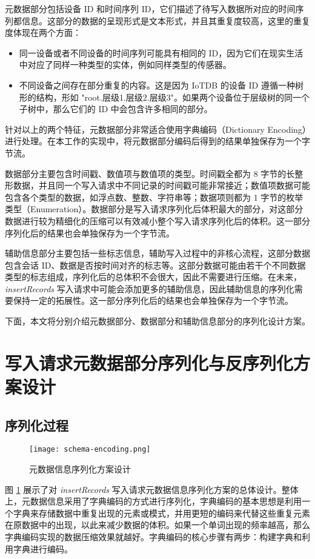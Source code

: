 元数据部分包括设备 ID 和时间序列 ID，它们描述了待写入数据所对应的时间序列都信息。这部分的数据的呈现形式是文本形式，并且其重复度较高，这里的重复度体现在两个方面：
\begin{itemize}
  \item 同一设备或者不同设备的时间序列可能具有相同的 ID，因为它们在现实生活中对应了同样一种类型的实体，例如同样类型的传感器。
  \item 不同设备之间存在部分重复的内容。这是因为 IoTDB 的设备 ID 遵循一种树形的结构，形如 "root.层级1.层级2.层级3"。如果两个设备位于层级树的同一个子树中，那么它们的 ID 中会包含许多相同的部分。
\end{itemize}
针对以上的两个特征，元数据部分非常适合使用字典编码（Dictionary Encoding）进行处理。在本工作的实现中，将元数据部分编码后得到的结果单独保存为一个字节流。

数据部分主要包含时间戳、数值项与数值项的类型。时间戳全都为 8 字节的长整形数据，并且同一个写入请求中不同记录的时间戳可能非常接近；数值项数据可能包含各个类型的数据，如浮点数、整数、字符串等；数据项则都为 1 字节的枚举类型（Enumeration）。数据部分是写入请求序列化后体积最大的部分，对这部分数据进行较为精细化的压缩可以有效减小整个写入请求序列化后的体积。这一部分序列化后的结果也会单独保存为一个字节流。

辅助信息部分主要包括一些标志信息，辅助写入过程中的非核心流程，这部分数据包含会话 ID、数据是否按时间对齐的标志等。这部分数据可能由若干个不同数据类型的标志组成，序列化后的总体积不会很大，因此不需要进行压缩。在未来，\emph{insertRecords} 写入请求中可能会添加更多的辅助信息，因此辅助信息的序列化需要保持一定的拓展性。这一部分序列化后的结果也会单独保存为一个字节流。

下面，本文将分别介绍元数据部分、数据部分和辅助信息部分的序列化设计方案。



\section{写入请求元数据部分序列化与反序列化方案设计}
\subsection{序列化过程}
\begin{figure}
  \centering
  \texttt{[image: schema-encoding.png]}
  \caption{元数据信息序列化方案设计}
  \label{fig:schema-encoding-general}
\end{figure}

图 \ref{fig:schema-encoding-general} 展示了对 \emph{insertRecords} 写入请求元数据信息序列化方案的总体设计。整体上，元数据信息采用了字典编码的方式进行序列化，字典编码的基本思想是利用一个字典来存储数据中重复出现的元素或模式，并用更短的编码来代替这些重复元素在原数据中的出现，以此来减少数据的体积。如果一个单词出现的频率越高，那么字典编码实现的数据压缩效果就越好。字典编码的核心步骤有两步：构建字典和利用字典进行编码。

